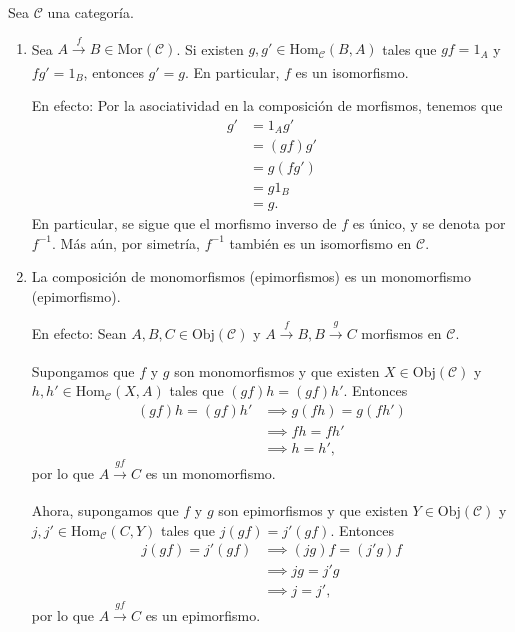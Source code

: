 \documentclass[tesis]{subfiles}
\begin{document}
\begin{Obs}\label{Obs: Morfismos especiales}

    Sea $\mathscr{C}$ una categoría.
    \begin{enumerate}[label=(\arabic*)]

        \item Sea $A\xrightarrow[]{f}B\in\text{Mor}(\mathscr{C})$. Si existen $g,g'\in\text{Hom}_\mathscr{C}(B,A)$ tales que $gf=1_A$ y $fg'=1_B$, entonces $g'=g$. En particular, $f$ es un isomorfismo.

            En efecto: Por la asociatividad en la composición de morfismos, tenemos que
            \begin{align*}
                g' &= 1_Ag' \\
                   &= (gf)g' \\
                   &= g(fg') \\
                   &= g1_B \\
                   &= g.
            \end{align*}
            En particular, se sigue que el morfismo inverso de $f$ es único, y se denota por $f^{-1}$. Más aún, por simetría, $f^{-1}$ también es un isomorfismo en $\mathscr{C}$.

        \item La composición de monomorfismos (epimorfismos) es un monomorfismo (epimorfismo).

            En efecto: Sean $A,B,C\in\text{Obj}(\mathscr{C})$ y $A\xrightarrow[]{f} B, B\xrightarrow[]{g} C$ morfismos en $\mathscr{C}$.

            Supongamos que $f$ y $g$ son monomorfismos y que existen $X\in\text{Obj}(\mathscr{C})$ y $h,h'\in\text{Hom}_\mathscr{C}(X,A)$ tales que $(gf)h = (gf)h'$. Entonces
            \begin{align*}
                (gf)h = (gf)h' &\implies g(fh) = g(fh') \\ &\implies fh = fh' \tag{$g$ es monomorfismo} \\
                                   &\implies h = h', \tag{$f$ es monomorfismo}
            \end{align*}
            \noindent por lo que $A\xrightarrow[]{gf} C$ es un monomorfismo.

            Ahora, supongamos que $f$ y $g$ son epimorfismos y que existen $Y\in\text{Obj}(\mathscr{C})$ y $j,j'\in\text{Hom}_\mathscr{C}(C,Y)$ tales que $j(gf) = j'(gf)$. Entonces
            \begin{align*}
            j(gf) = j'(gf) &\implies (jg)f = (j'g)f \\ &\implies jg = j'g \tag{$f$ es epimorfismo} \\
                                   &\implies j = j', \tag{$g$ es epimorfismo}
            \end{align*}
            \noindent por lo que $A\xrightarrow[]{gf} C$ es un epimorfismo.


\end{enumerate}
\end{Obs}
\end{document}
